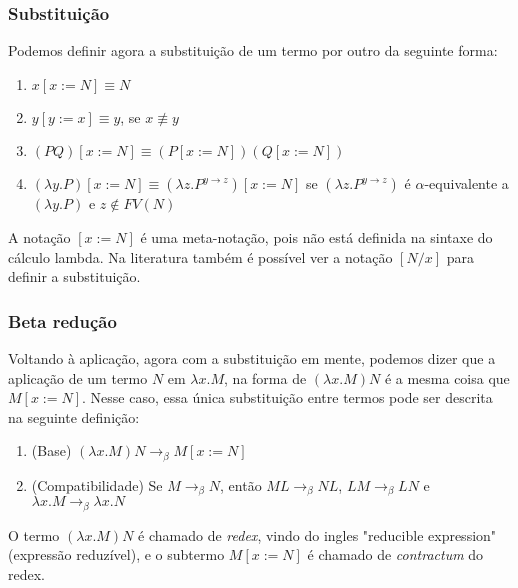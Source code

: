 \documentclass[../main.tex]{subfiles}
\begin{document}
\subsubsection{Substituição}

Podemos definir agora a substituição de um termo por outro da seguinte forma:

\begin{definition}[Substituição]
    \hfill
    \begin{enumerate}
        \item $x [x := N] \equiv N$
        \item $y [y := x] \equiv y$, se $x \not\equiv y$
        \item $(PQ)[x := N] \equiv (P[x := N])(Q[x := N])$
        \item $(\lambda y . P)[x := N] \equiv (\lambda z . P^{y \to z})[x := N]$ se $(\lambda z . P^{y \to z})$ é $\alpha$-equivalente a $(\lambda y . P)$ e $z \not\in FV(N)$
    \end{enumerate}
\end{definition}

A notação $[x := N]$ é uma meta-notação, pois não está definida na sintaxe do cálculo lambda. Na literatura também é possível ver a notação $[N / x]$ para definir a substituição.

\subsubsection{Beta redução}

Voltando à aplicação, agora com a substituição em mente, podemos dizer que a aplicação de um termo $N$ em $\lambda x . M$, na forma de $(\lambda x . M)N$ é a mesma coisa que $M [x := N]$. Nesse caso, essa única substituição entre termos pode ser descrita na seguinte definição:

\begin{definition}
    \hfill
    \begin{enumerate}
        \item (Base) $(\lambda x . M)N \to_{\beta} M [x := N]$
        \item (Compatibilidade) Se $M \to_{\beta} N$, então $ML \to_{\beta} NL$, $LM \to_{\beta} LN$ e $\lambda x . M \to_{\beta} \lambda x . N$
    \end{enumerate}
\end{definition}

O termo $(\lambda x . M)N$ é chamado de \emph{redex}, vindo do ingles "reducible expression" (expressão reduzível), e o subtermo $M [x := N]$ é chamado de \emph{contractum} do redex.
\end{document}
